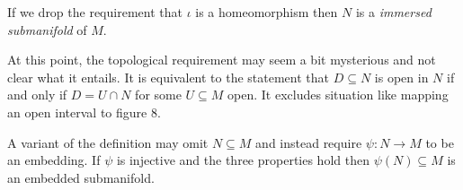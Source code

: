 \documentclass[a4paper]{article}
\begin{document}
\begin{definition}
  If we drop the requirement that \(\iota\) is a homeomorphism then \(N\) is a \emph{immersed submanifold} of \(M\).
\end{definition}

At this point, the topological requirement may seem a bit mysterious and not clear what it entails. It is equivalent to the statement that \(D \subseteq N\) is open in \(N\) if and only if \(D = U \cap N\) for some \(U \subseteq M\) open. It excludes situation like mapping an open interval to figure 8.

A variant of the definition may omit \(N \subseteq M\) and instead require \(\psi: N \to M\) to be an embedding. If \(\psi\) is injective and the three properties hold then \(\psi(N) \subseteq M\) is an embedded submanifold.














\printindex
\end{document}
